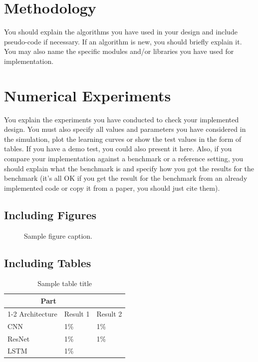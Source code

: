 \documentclass{article}
\begin{document}
\section{Methodology}
You should explain the algorithms you have used in your design and include pseudo-code if necessary. If an algorithm is new, you should briefly explain it. You may also name the specific modules and/or libraries you have used for implementation.


\section{Numerical Experiments}

You explain the experiments you have conducted to check your implemented design. You must also specify all values and parameters you have considered in the simulation, plot the learning curves or show the test values in the form of tables. If you have a demo test, you could also present it here. Also, if you compare your implementation against a benchmark or a reference setting, you should explain what the benchmark is and specify how you got the results for the benchmark (it's all OK if you get the result for the benchmark from an already implemented code or copy it from a paper, you should just cite them).

\subsection{Including Figures}


\begin{figure}
  \centering
  \fbox{\rule[-.5cm]{0cm}{4cm} \rule[-.5cm]{4cm}{0cm}}
  \caption{Sample figure caption.}
\end{figure}



\subsection{Including Tables}

\begin{table}
  \caption{Sample table title}
  \label{sample-table}
  \centering
  \begin{tabular}{lll}
    \toprule
    \multicolumn{2}{c}{Part}                   \\
    \cmidrule(r){1-2}
    Architecture     & Result 1     & Result 2 \\
    \midrule
    CNN & 1\%  &1\%   \\
    ResNet     &1\% &1\%      \\
    LSTM     &1\%       &   \\
    \bottomrule
  \end{tabular}
\end{table}
\end{document}
